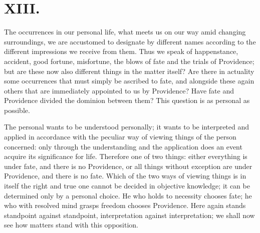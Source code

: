 \documentclass[12pt]{book}
\newcommand{\opage}[1]{\marginnote{\footnotesize\textit{[#1]}}}
\begin{document}
\chapter*{XIII.}
\label{ch:xiii}
\opage{208}\setcounter{footnote}{0}%
The occurrences in our personal life, what meets us on our way amid
changing surroundings, we are accustomed to designate by different names
according to the different impressions we receive from them. Thus we
speak of happenstance, accident, good fortune, misfortune, the blows of
fate and the trials of Providence; but are these now also different
things in the matter itself? Are there in actuality some occurrences
that must simply be ascribed to fate, and alongside these again others
that are immediately appointed to us by Providence? Have fate and
Providence divided the dominion between them? This question is as
personal as possible.

The personal wants to be understood personally; it wants to be
interpreted and applied in accordance with the peculiar way of viewing
things of the person concerned: only through the understanding and the
application does an event acquire its significance for life. Therefore
one of two things: either everything is under fate, and there is no
Providence, or all things without exception are under Providence, and
there is no fate. Which of the two ways of viewing things is in itself
the right and true one cannot be decided in objective knowledge; it can
be determined only by a personal choice. He who holds to necessity
chooses fate; he who
\opage{209}\setcounter{footnote}{0}%
with resolved mind grasps freedom chooses Providence. Here again stands
standpoint against standpoint, interpretation against interpretation; we
shall now see how matters stand with this opposition.
\end{document}
